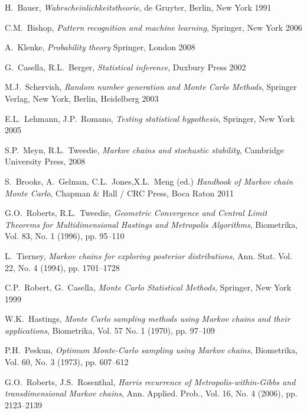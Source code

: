\documentclass[a4paper, draft]{article}
\theoremstyle{own}
\theoremstyle{remark}
\begin{document}

\begin{thebibliography}{9}
	
H.~Bauer,
{\em Wahrscheinlichkeitstheorie},
de Gruyter, Berlin, New York 1991
	

C.M.~Bishop, 
{\em Pattern recognition and machine learning},
Springer, New York 2006

A.~Klenke,
{\em Probability theory}
Springer, London 2008


G.~Casella, R.L.~Berger,
{\em Statistical inference},
Duxbury Press 2002

M.J.~Schervish,
{\em Random number generation and Monte Carlo Methods},
Springer Verlag, New York, Berlin, Heidelberg 2003

E.L.~Lehmann, J.P.~Romano,
{\em Testing statistical hypothesis},
Springer, New York 2005

S.P.~Meyn, R.L.~Tweedie,
{\em Markov chains and stochastic stability},
Cambridge University Press, 2008

S.~Brooks, A.~Gelman, C.L.~Jones,X.L.~Meng (ed.)
{\em Handbook of Markov chain Monte Carlo},
Chapman \& Hall / CRC Press, Boca Raton 2011

G.O.~Roberts, R.L.~Tweedie,
{\em Geometric Convergence and Central Limit Theorems for Multidimensional Hastings and
	Metropolis Algorithms},
Biometrika, Vol. 83, No. 1 (1996), pp. 95--110

L.~Tierney, 
{\em Markov chains for exploring posterior distributions},
Ann. Stat. Vol. 22, No. 4 (1994), pp. 1701--1728

C.P.~Robert, G.~Casella,
{\em Monte Carlo Statistical Methods},
Springer, New York 1999


W.K.~Hastings,
{\em Monte Carlo sampling methods using Markov chains and their applications},
Biometrika, Vol. 57 No. 1 (1970), pp. 97--109


P.H.~Peskun,
{\em Optimum Monte-Carlo sampling using Markov chains},
Bio\-metrika, Vol. 60, No. 3 (1973), pp. 607--612

G.O.~Roberts, J.S.~Rosenthal,
{\em Harris recurrence of Metropolis-within-Gibbs and transdimensional Markov chains},
Ann. Applied. Prob., Vol. 16, No. 4 (2006), pp. 2123--2139


\end{thebibliography}
\end{document}
